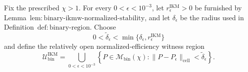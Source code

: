 Fix the prescribed \(\chi>1\). For every \(0<\epsilon<10^{-3}\), let \(r_\epsilon^{\mathrm{IKM}}>0\) be furnished by Lemma~\(\mathrm{lem{:}binary\text{-}ikmw\text{-}normalized\text{-}stability}\), and let \(\delta_\epsilon\) be the radius used in Definition~\(\mathrm{def{:}binary\text{-}region}\). Choose
\[
 0<\widetilde\delta_\epsilon
 <\min\{\delta_\epsilon,r_\epsilon^{\mathrm{IKM}}\}
\]
and define the relatively open normalized-efficiency witness region
\[
 \mathcal U_{\mathrm{bin}}^{\mathrm{IKM}}
 =\bigcup_{0<\epsilon<10^{-3}}
 \left\{P\in\mathcal M_{\mathrm{bin}}(\chi):
 \|P-P_\epsilon\|_{\mathrm{cell}}<\widetilde\delta_\epsilon\right\}.
\]